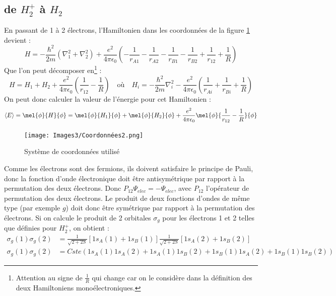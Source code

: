 \subsection{de $H_2^+$ à $H_2$}

En passant de 1 à 2 électrons, l'Hamiltonien dans les coordonnées de la figure \ref{fig:Coor} devient : 
\begin{equation*}
    H = -\frac{\hbar^2}{2m}(\nabla^2_1+\nabla^2_2) + \frac{e^2}{4\pi\epsilon_0}\left(-\frac{1}{r_{A1}}-\frac{1}{r_{A2}}-\frac{1}{r_{B1}}-\frac{1}{r_{B2}}+\frac{1}{r_{12}}+\frac{1}{R}\right)
\end{equation*}
Que l'on peut décomposer en\footnote{Attention au signe de $\frac{1}{R}$ qui change car on le considère dans la définition des deux Hamiltoniens monoélectroniques.} : 
\begin{equation*}
    H = H_1 + H_2 +\frac{e^2}{4\pi\epsilon_0}\left(\frac{1}{r_{12}}-\frac{1}{R}\right) \quad \textrm{où} \quad H_i = -\frac{\hbar^2}{2m}\nabla^2_i - \frac{e^2}{4\pi\epsilon_0}\left(\frac{1}{r_{Ai}}+\frac{1}{r_{Bi}}+\frac{1}{R}\right)
\end{equation*}
On peut donc calculer la valeur de l'énergie pour cet Hamiltonien : 
\begin{equation*}
    \langle E \rangle = \mel{\phi}{H}{\phi} = \mel{\phi}{H_1}{\phi} + \mel{\phi}{H_2}{\phi} + \frac{e^2}{4\pi\epsilon_0}\mel{\phi}{\frac{1}{r_{12}}-\frac{1}{R}}{\phi}
\end{equation*}
\begin{figure}[ht]
    \centering
    \texttt{[image: Images3/Coordonnées2.png]}
    \caption{Système de coordonnées utilisé}
    \label{fig:Coor}
\end{figure}
Comme les électrons sont des fermions, ils doivent satisfaire le principe de Pauli, donc la fonction d'onde électronique doit être antisymétrique par rapport à la permutation des deux électrons. Donc $P_{12}\Psi_{elec} = -\Psi_{elec}$, avec $P_{12}$ l'opérateur de permutation des deux électrons.\newline
Le produit de deux fonctions d'ondes de même type (par exemple $g$) doit donc être symétrique par rapport à la permutation des électrons. Si on calcule le produit de 2 orbitales $\sigma_g$ pour les électrons 1 et 2 telles que définies pour $H^+_2$, on obtient : 
\begin{equation*}
    \begin{split}
        \sigma_g(1)\sigma_g(2) &= \frac{1}{\sqrt{2+2S}}[1s_A(1)+1s_B(1)] \frac{1}{\sqrt{2+2S}}[1s_A(2)+1s_B(2)]\\
        \sigma_g(1)\sigma_g(2) &= Cste(1s_A(1)1s_A(2)+1s_A(1)1s_B(2)+1s_B(1)1s_A(2)+1s_B(1)1s_B(2))
    \end{split}
\end{equation*}
